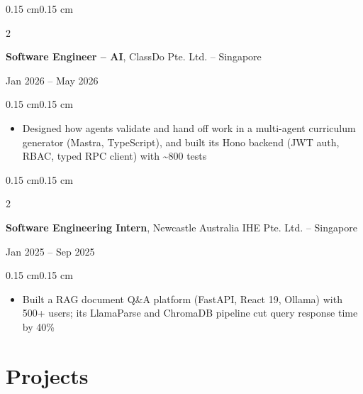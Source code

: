 \documentclass[10pt, letterpaper]{article}
\newenvironment{highlights}{
    \begin{itemize}[
        topsep=0.08 cm,
        parsep=0.05 cm,
        partopsep=0pt,
        itemsep=0pt,
        leftmargin=0.4 cm
    ]
}{
    \end{itemize}
}
\newenvironment{onecolentry}{
    \begin{adjustwidth}{0.15 cm}{0.15 cm}
}{
    \end{adjustwidth}
}
\newenvironment{twocolentry}[2][]{
    \onecolentry
    \def\secondColumn{#2}
    \setcolumnwidth{\fill, 4.5 cm}
    \begin{paracol}{2}
}{
    \switchcolumn \raggedleft \secondColumn
    \end{paracol}
    \endonecolentry
}
\begin{document}
        \vspace{0.15 cm}

        \begin{twocolentry}{
            Jan 2026 -- May 2026
        }
            \textbf{Software Engineer -- AI}, ClassDo Pte. Ltd. -- Singapore
        \end{twocolentry}
        \vspace{0.08 cm}
        \begin{onecolentry}
            \begin{highlights}
                \item Designed how agents validate and hand off work in a multi-agent curriculum generator (Mastra, TypeScript), and built its Hono backend (JWT auth, RBAC, typed RPC client) with \textasciitilde800 tests
            \end{highlights}
        \end{onecolentry}

        \vspace{0.15 cm}

        \begin{twocolentry}{
            Jan 2025 -- Sep 2025
        }
            \textbf{Software Engineering Intern}, Newcastle Australia IHE Pte. Ltd. -- Singapore
        \end{twocolentry}
        \vspace{0.08 cm}
        \begin{onecolentry}
            \begin{highlights}
                \item Built a RAG document Q\&A platform (FastAPI, React 19, Ollama) with 500+ users; its LlamaParse and ChromaDB pipeline cut query response time by 40\%
            \end{highlights}
        \end{onecolentry}

    \section{Projects}
\end{document}
